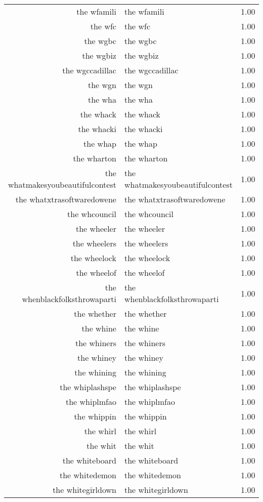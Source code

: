 \begin{table}[ht]
\begin{tabular}{rlr}
  the wfamili & the wfamili & 1.00 \\ 
  the wfc & the wfc & 1.00 \\ 
  the wgbc & the wgbc & 1.00 \\ 
  the wgbiz & the wgbiz & 1.00 \\ 
  the wgccadillac & the wgccadillac & 1.00 \\ 
  the wgn & the wgn & 1.00 \\ 
  the wha & the wha & 1.00 \\ 
  the whack & the whack & 1.00 \\ 
  the whacki & the whacki & 1.00 \\ 
  the whap & the whap & 1.00 \\ 
  the wharton & the wharton & 1.00 \\ 
  the whatmakesyoubeautifulcontest & the whatmakesyoubeautifulcontest & 1.00 \\ 
  the whatxtrasoftwaredowene & the whatxtrasoftwaredowene & 1.00 \\ 
  the whcouncil & the whcouncil & 1.00 \\ 
  the wheeler & the wheeler & 1.00 \\ 
  the wheelers & the wheelers & 1.00 \\ 
  the wheelock & the wheelock & 1.00 \\ 
  the wheelof & the wheelof & 1.00 \\ 
  the whenblackfolksthrowaparti & the whenblackfolksthrowaparti & 1.00 \\ 
  the whether & the whether & 1.00 \\ 
  the whine & the whine & 1.00 \\ 
  the whiners & the whiners & 1.00 \\ 
  the whiney & the whiney & 1.00 \\ 
  the whining & the whining & 1.00 \\ 
  the whiplashspe & the whiplashspe & 1.00 \\ 
  the whiplmfao & the whiplmfao & 1.00 \\ 
  the whippin & the whippin & 1.00 \\ 
  the whirl & the whirl & 1.00 \\ 
  the whit & the whit & 1.00 \\ 
  the whiteboard & the whiteboard & 1.00 \\ 
  the whitedemon & the whitedemon & 1.00 \\ 
  the whitegirldown & the whitegirldown & 1.00 \\ 

\end{tabular}
\end{table}
